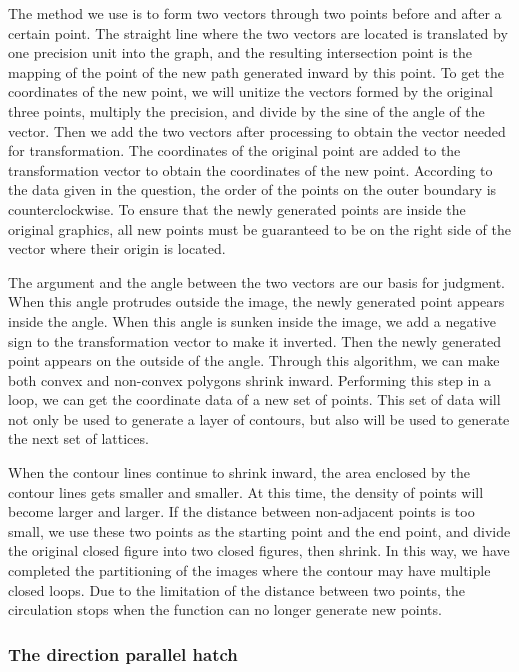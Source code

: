 \documentclass{apmcmthesis}
\begin{document}
The method we use is to form two vectors through two points before and after a certain point. The straight line where the two vectors are located is translated by one precision unit into the graph, and the resulting intersection point is the mapping of the point of the new path generated inward by this point. To get the coordinates of the new point, we will unitize the vectors formed by the original three points, multiply the precision, and divide by the sine of the angle of the vector. Then we add the two vectors after processing to obtain the vector needed for transformation. The coordinates of the original point are added to the transformation vector to obtain the coordinates of the new point. According to the data given in the question, the order of the points on the outer boundary is counterclockwise. To ensure that the newly generated points are inside the original graphics, all new points must be guaranteed to be on the right side of the vector where their origin is located.


The argument and the angle between the two vectors are our basis for judgment. When this angle protrudes outside the image, the newly generated point appears inside the angle. When this angle is sunken inside the image, we add a negative sign to the transformation vector to make it inverted. Then the newly generated point appears on the outside of the angle. Through this algorithm, we can make both convex and non-convex polygons shrink inward. Performing this step in a loop, we can get the coordinate data of a new set of points. This set of data will not only be used to generate a layer of contours, but also will be used to generate the next set of lattices.


When the contour lines continue to shrink inward, the area enclosed by the contour lines gets smaller and smaller. At this time, the density of points will become larger and larger. If the distance between non-adjacent points is too small, we use these two points as the starting point and the end point, and divide the original closed figure into two closed figures, then shrink. In this way, we have completed the partitioning of the images where the contour may have multiple closed loops. Due to the limitation of the distance between two points, the circulation stops when the function can no longer generate new points.


\subsubsection{The direction parallel hatch}
\end{document}
